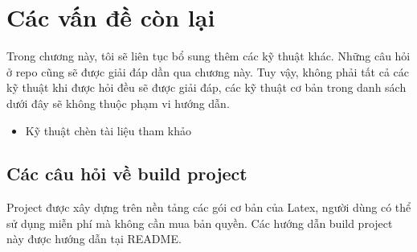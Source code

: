 \chapter{Các vấn đề còn lại}
\label{chap:chap4-summary}

Trong chương này, tôi sẽ liên tục bổ sung thêm các kỹ thuật khác. Những câu hỏi ở repo cũng sẽ được giải đáp dần qua chương này. Tuy vậy, không phải tất cả các kỹ thuật khi được hỏi đều sẽ được giải đáp, các kỹ thuật cơ bản trong danh sách dưới đây sẽ không thuộc phạm vi hướng dẫn.

\begin{itemize}
    \item Kỹ thuật chèn tài liệu tham khảo
\end{itemize}

\section{Các câu hỏi về build project}

Project được xây dựng trên nền tảng các gói cơ bản của Latex, người dùng có thể sử dụng miễn phí mà không cần mua bản quyền. Các hướng dẫn build project này được hướng dẫn tại README.